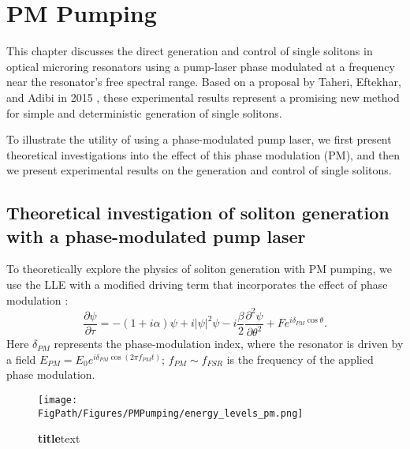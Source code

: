  \chapter{PM Pumping} \label{ch:PMPumping}

This chapter discusses the direct generation and control of single solitons in optical microring resonators using a pump-laser phase modulated at a frequency near the resonator's free spectral range. Based on a proposal by Taheri, Eftekhar, and Adibi in 2015 \cite{Taheri2015}, these experimental results represent a promising new method for simple and deterministic generation of single solitons. 

To illustrate the utility of using a phase-modulated pump laser, we first present theoretical investigations into the effect of this phase modulation (PM), and then we present experimental results on the generation and control of single solitons.

\section{Theoretical investigation of soliton generation with a phase-modulated pump laser}


To theoretically explore the physics of soliton generation with PM pumping, we use the LLE with a modified driving term that incorporates the effect of phase modulation \cite{Taheri2015}:
\begin{equation}
\frac{\partial \psi}{\partial \tau}=-(1+i \alpha) \psi + i|\psi|^2 \psi -i \frac{\beta}{2} \frac{\partial^2 \psi}{\partial \theta^2} +Fe^{i\delta_{PM}\cos{\theta}}. \label{eq:PMLLE}
\end{equation}
Here $\delta_{PM}$ represents the phase-modulation index, where the resonator is driven by a field $E_{PM}=E_0 e^{i\delta_{PM}\cos(2\pi f_{PM}t)}$; $f_{PM}\sim f_{FSR}$ is the frequency of the applied phase modulation.

\begin{figure}[htpb]
	\begin{center}
		\texttt{[image: \\FigPath/Figures/PMPumping/energy\_levels\_pm.png]}
	\end{center}
	\caption[Figure Title]{\textbf{title}text}
	\label{fig:PMenergylevels}
\end{figure} 

